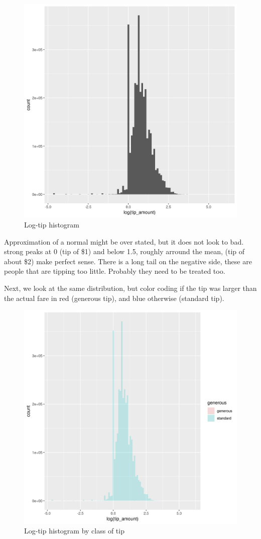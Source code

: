 \documentclass[11pt]{article}
\begin{document}
\begin{figure}[htbp]
\centering
\includegraphics[width=.9\linewidth]{./plots/logTipHist.jpg}
\caption{\label{fig:orga1fd2ea}
Log-tip histogram}
\end{figure}

Approximation of a normal might be over stated, but it does not look to bad.
strong peaks at 0 (tip of \$1) and below 1.5, roughly arround the mean,
(tip of about \$2) make perfect sense. There is a long tail on the negative
side, these are people that are tipping too little. Probably they need to
be treated too.

Next, we look at the same distribution, but color coding if the tip was
larger than the actual fare in red (generous tip), and blue otherwise
(standard tip).

\begin{figure}[htbp]
\centering
\includegraphics[width=.9\linewidth]{./plots/logTipGenerousHist.jpg}
\caption{\label{fig:org4b7957e}
Log-tip histogram by class of tip}
\end{figure}
\end{document}
